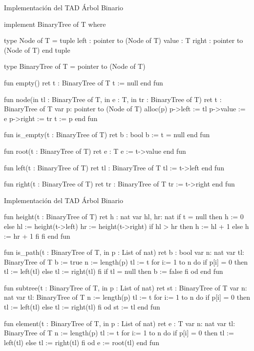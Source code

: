 \begin{codebox}{Implementación del TAD Árbol Binario}
\begin{pascallike}
implement BinaryTree of T where

type Node of T = tuple
                    left : pointer to (Node of T)
                    value : T
                    right : pointer to (Node of T)
                 end tuple

type BinaryTree of T = pointer to (Node of T)

fun empty() ret t : BinaryTree of T
    t := null
end fun

fun node(in tl : BinaryTree of T, in e : T, in tr : BinaryTree of T)
ret t : BinaryTree of T
    var p: pointer to (Node of T)
    alloc(p)
    p->left := tl
    p->value := e
    p->right := tr
    t := p
end fun

fun is_empty(t : BinaryTree of T) ret b : bool
    b := t = null
end fun

fun root(t : BinaryTree of T) ret e : T
    e := t->value
end fun

fun left(t : BinaryTree of T) ret tl : BinaryTree of T
    tl := t->left
end fun

fun right(t : BinaryTree of T) ret tr : BinaryTree of T
    tr := t->right
end fun
\end{pascallike}
\end{codebox}
\begin{codebox}{Implementación del TAD Árbol Binario}
\begin{pascallike}
fun height(t : BinaryTree of T) ret h : nat
    var hl, hr: nat
    if t = null then
        h := 0
    else
        hl := height(t->left)
        hr := height(t->right)
        if hl > hr then
            h := hl + 1
        else
            h := hr + 1
        fi
    fi
end fun

fun is_path(t : BinaryTree of T, in p : List of nat) ret b : bool
    var n: nat
    var tl: BinaryTree of T
    b := true
    n := length(p)
    tl := t
    for i:= 1 to n do
        if p[i] = 0 then
            tl := left(tl)
        else
            tl := right(tl)
        fi
        if tl = null then
            b := false
        fi
    od
end fun

fun subtree(t : BinaryTree of T, in p : List of nat) ret st : BinaryTree of T
    var n: nat
    var tl: BinaryTree of T
    n := length(p)
    tl := t
    for i:= 1 to n do
        if p[i] = 0 then
            tl := left(tl)
        else
            tl := right(tl)
        fi
    od
    st := tl
end fun

fun element(t : BinaryTree of T, in p : List of nat) ret e : T
    var n: nat
    var tl: BinaryTree of T
    n := length(p)
    tl := t
    for i:= 1 to n do
        if p[i] = 0 then
            tl := left(tl)
        else
            tl := right(tl)
        fi
    od
    e := root(tl)
end fun
\end{pascallike}
\end{codebox}
